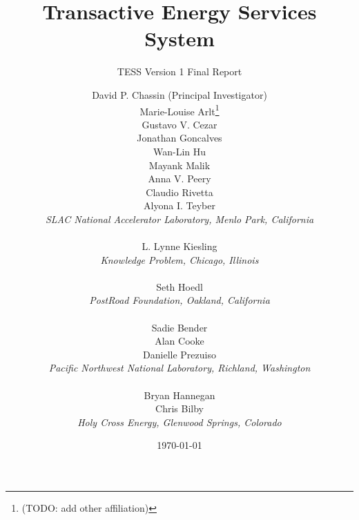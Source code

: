 \title{Transactive Energy Services System}
\subtitle{TESS Version 1 Final Report}

\author
{
    David P. Chassin (Principal Investigator) 
\\
    Marie-Louise Arlt\footnote{(TODO: add other affiliation)}
\\
    Gustavo V. Cezar
\\
    Jonathan Goncalves
\\
    Wan-Lin Hu
\\
    Mayank Malik
\\
    Anna V. Peery 
\\
    Claudio Rivetta
\\
    Alyona I. Teyber
\\
    \textit{SLAC National Accelerator Laboratory, Menlo Park, California}
\\~\\
    L. Lynne Kiesling
\\
    \textit{Knowledge Problem, Chicago, Illinois}
\\~\\
    Seth Hoedl
\\
    \textit{PostRoad Foundation, Oakland, California}
\\~\\        
    Sadie Bender 
\\
    Alan Cooke
\\
    Danielle Prezuiso
\\
    \textit{Pacific Northwest National Laboratory, Richland, Washington}
\\~\\        
    Bryan Hannegan
\\
    Chris Bilby
\\
    \textit{Holy Cross Energy, Glenwood Springs, Colorado}
}

\date{\today}

